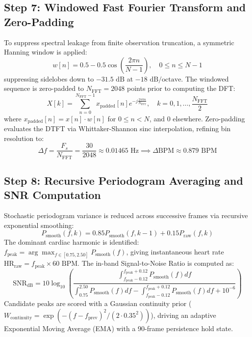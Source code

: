 \documentclass[11pt,a4paper]{report}
\begin{document}
\subsection{Step 7: Windowed Fast Fourier Transform and Zero-Padding}
To suppress spectral leakage from finite observation truncation, a symmetric Hanning window is applied:
\begin{equation}
    w[n] = 0.5 - 0.5 \cos\left( \frac{2\pi n}{N - 1} \right), \quad 0 \le n \le N - 1
\end{equation}
suppressing sidelobes down to $-31.5\text{ dB}$ at $-18\text{ dB/octave}$. The windowed sequence is zero-padded to $N_{\text{FFT}} = 2048$ points prior to computing the DFT:
\begin{equation}
    X[k] = \sum_{n=0}^{N_{\text{FFT}}-1} x_{\text{padded}}[n] e^{-j \frac{2\pi k n}{N_{\text{FFT}}}}, \quad k = 0, 1, \dots, \frac{N_{\text{FFT}}}{2}
\end{equation}
where $x_{\text{padded}}[n] = x[n] \cdot w[n]$ for $0 \le n < N$, and $0$ elsewhere. Zero-padding evaluates the DTFT via Whittaker-Shannon sinc interpolation, refining bin resolution to:
\begin{equation}
    \Delta f = \frac{F_s}{N_{\text{FFT}}} = \frac{30}{2048} \approx 0.01465\text{ Hz} \implies \Delta \text{BPM} \approx 0.879\text{ BPM}
\end{equation}

\subsection{Step 8: Recursive Periodogram Averaging and SNR Computation}
Stochastic periodogram variance is reduced across successive frames via recursive exponential smoothing:
\begin{equation}
    P_{\text{smooth}}(f, k) = 0.85 P_{\text{smooth}}(f, k-1) + 0.15 P_{\text{raw}}(f, k)
\end{equation}
The dominant cardiac harmonic is identified: $f_{\text{peak}} = \arg\max_{f \in [0.75, 2.50]} P_{\text{smooth}}(f)$, giving instantaneous heart rate $\text{HR}_{\text{raw}} = f_{\text{peak}} \times 60\text{ BPM}$. 
The in-band Signal-to-Noise Ratio is computed as:
\begin{equation}
    \text{SNR}_{\text{dB}} = 10 \log_{10}\left( \frac{\int_{f_{\text{peak}} - 0.12}^{f_{\text{peak}} + 0.12} P_{\text{smooth}}(f) df}{\int_{0.75}^{2.50} P_{\text{smooth}}(f) df - \int_{f_{\text{peak}} - 0.12}^{f_{\text{peak}} + 0.12} P_{\text{smooth}}(f) df + 10^{-6}} \right)
\end{equation}
Candidate peaks are scored with a Gaussian continuity prior ($W_{\text{continuity}} = \exp(-(f - f_{\text{prev}})^2 / (2 \cdot 0.35^2))$), driving an adaptive Exponential Moving Average (EMA) with a 90-frame persistence hold state.
\end{document}
